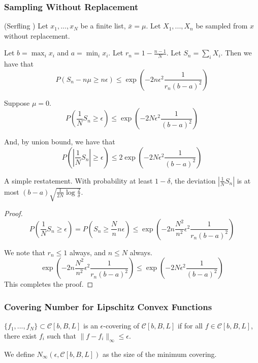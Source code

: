 \subsubsection{Sampling Without Replacement}

\begin{lemma} (Serfling \cite{serfling1974probability}) 
Let $x_1,..., x_N$ be a finite list, $\bar{x} = \mu$. Let $X_1,...,X_n$ be sampled from $x$ without replacement. 

Let $b = \max_i x_i$ and $a = \min_i x_i$. Let $r_n = 1- \frac{n-1}{N}$. Let $S_n = \sum_i X_i$.
Then we have that
\[
P( S_n - n \mu \geq n \epsilon) \leq \exp( - 2 n \epsilon^2 \frac{1}{r_n (b-a)^2})
\]
\end{lemma}

\begin{corollary}
\label{cor:serfling}
Suppose $\mu = 0$. 
\[
P( \frac{1}{N} S_n \geq \epsilon) \leq \exp( -2 N \epsilon^2 \frac{1}{(b-a)^2})
\]

And, by union bound, we have that
\[
P( | \frac{1}{N} S_n| \geq \epsilon) \leq 2 \exp( -2 N \epsilon^2 \frac{1}{(b-a)^2})
\]

\end{corollary}

A simple restatement. With probability at least $1- \delta$, the deviation $| \frac{1}{N} S_n|$ is at most $ (b-a) \sqrt{ \frac{1}{2N} \log \frac{2}{\delta}}$.

\begin{proof}
\[
P( \frac{1}{N} S_n \geq \epsilon) = P( S_n \geq \frac{N}{n} n \epsilon) \leq \exp( - 2 n \frac{N^2}{n^2} \epsilon^2 \frac{1}{r_n (b-a)^2} ) 
\]

We note that $r_n \leq 1$ always, and $n \leq N$ always. 
\[
\exp( - 2 n \frac{N^2}{n^2} \epsilon^2 \frac{1}{r_n (b-a)^2} )  \leq \exp( - 2 N \epsilon^2 \frac{1}{(b-a)^2})
\]
This completes the proof.

\end{proof}

\subsubsection{Covering Number for Lipschitz Convex Functions}

\begin{definition}
$\{ f_1,..., f_N\} \subset \mathcal{C}[b,B,L]$ is an $\epsilon$-covering of $\mathcal{C}[b,B,L]$ if for all $f \in \mathcal{C}[b,B,L]$, there exist $f_i$ such that $\| f - f_i \|_\infty \leq \epsilon$.

We define $N_\infty( \epsilon, \mathcal{C}[b,B,L])$ as the size of the minimum covering.
\end{definition}


